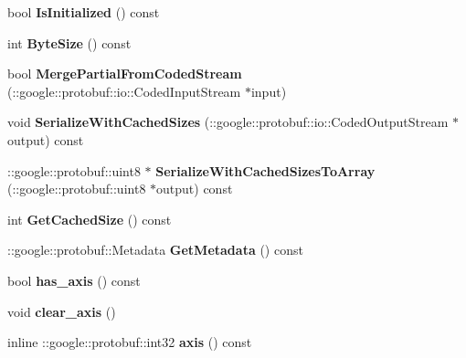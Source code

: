\begin{DoxyCompactItemize}
bool {\bfseries Is\+Initialized} () const
\item 
\mbox{\label{classcaffe_1_1_slice_parameter_aca17fc6812aa8a3f6efc99c17367396d}} 
int {\bfseries Byte\+Size} () const
\item 
\mbox{\label{classcaffe_1_1_slice_parameter_a22d1e8cb7037f4ee1db2bcf281b47ffc}} 
bool {\bfseries Merge\+Partial\+From\+Coded\+Stream} (\+::google\+::protobuf\+::io\+::\+Coded\+Input\+Stream $\ast$input)
\item 
\mbox{\label{classcaffe_1_1_slice_parameter_a2721d8a8797c38227c3ef16e66670bea}} 
void {\bfseries Serialize\+With\+Cached\+Sizes} (\+::google\+::protobuf\+::io\+::\+Coded\+Output\+Stream $\ast$output) const
\item 
\mbox{\label{classcaffe_1_1_slice_parameter_accdb2b21afc602bbcdb9205370ee76d4}} 
\+::google\+::protobuf\+::uint8 $\ast$ {\bfseries Serialize\+With\+Cached\+Sizes\+To\+Array} (\+::google\+::protobuf\+::uint8 $\ast$output) const
\item 
\mbox{\label{classcaffe_1_1_slice_parameter_a04eab2133c81ae79226931d7fab849ee}} 
int {\bfseries Get\+Cached\+Size} () const
\item 
\mbox{\label{classcaffe_1_1_slice_parameter_a1d4c3ef7bb5c1fc11ee3cd6cdcd0c24c}} 
\+::google\+::protobuf\+::\+Metadata {\bfseries Get\+Metadata} () const
\item 
\mbox{\label{classcaffe_1_1_slice_parameter_aaf0d6bcd0415ff2791415aaae0f3e55d}} 
bool {\bfseries has\+\_\+axis} () const
\item 
\mbox{\label{classcaffe_1_1_slice_parameter_a76b159d539afca6a392d75110a5a6e3e}} 
void {\bfseries clear\+\_\+axis} ()
\item 
\mbox{\label{classcaffe_1_1_slice_parameter_a1dfda8bb6074f739ee1b72dd2d1f8308}} 
inline \+::google\+::protobuf\+::int32 {\bfseries axis} () const
\item 

\end{DoxyCompactItemize}
